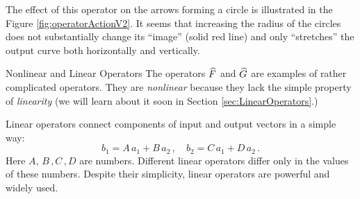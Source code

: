 The effect of this operator on the arrows forming a circle is
illustrated in the Figure \ref{fig:operatorActionV2}. It seems that
increasing the radius of the circles does not substantially change its
``image'' (solid red line)  and only ``stretches'' the output curve
both horizontally and vertically.

\begin{mybio}{Nonlinear and Linear Operators}
  The operators $\widehat{F}$ and $\widehat{G}$ are examples of rather
  complicated operators. They are
  \emph{nonlinear} because they lack
  the simple property of \emph{linearity} (we will learn about it
  soon in Section \ref{sec:LinearOperators}.)

  Linear operators connect components of input
  and output vectors in a simple way:
  \[
   b_1 = A\,a_1 + B\, a_2\,,\quad b_2 = C\,a_1 + D\, a_2\,.
   \]
   Here $A,\, B\,, C\,, D$ are numbers. Different linear operators
   differ only in the values of these numbers. Despite their
   simplicity, linear operators are powerful and widely used.
\end{mybio}

